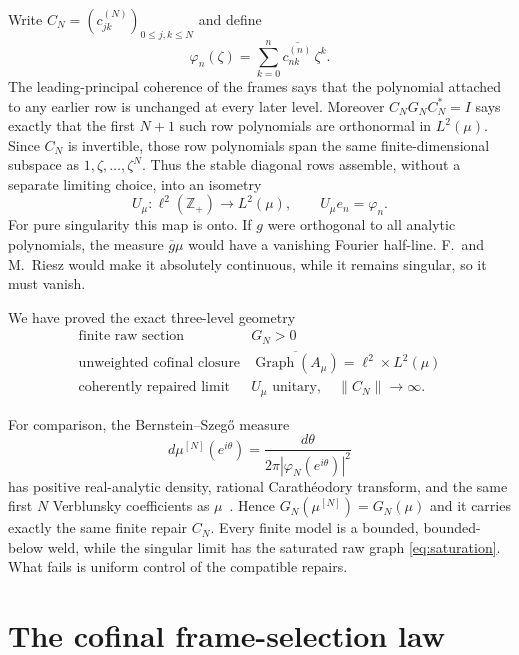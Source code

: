 \documentclass[11pt]{article}
\newcommand{\Graph}{\operatorname{Graph}}
\begin{document}
Write $C_N=(c^{(N)}_{jk})_{0\leq j,k\leq N}$ and define
\[
  \varphi_n(\zeta)=\sum_{k=0}^n\overline{c^{(n)}_{nk}}\,\zeta^k.
\]
The leading-principal coherence of the frames says that the polynomial attached to any earlier
row is unchanged at every later level.  Moreover $C_NG_NC_N^*=I$ says exactly that the first
$N+1$ such row polynomials are orthonormal in $L^2(\mu)$.  Since $C_N$ is invertible, those row
polynomials span the same finite-dimensional subspace as $1,\zeta,\ldots,\zeta^N$.  Thus the
stable diagonal rows assemble, without a separate limiting choice, into an isometry
\begin{equation}\label{eq:unitary-map}
  U_\mu:\ell^2(\mathbb Z_+)\longrightarrow L^2(\mu),
  \qquad U_\mu e_n=\varphi_n.
\end{equation}
For pure singularity this map is onto.  If $g$ were orthogonal to all analytic polynomials, the
measure $\overline g\mu$ would have a vanishing Fourier half-line.  F.~and M.~Riesz would make it
absolutely continuous, while it remains singular, so it must vanish.

We have proved the exact three-level geometry
\begin{equation}\label{eq:trichotomy}
\begin{array}{c|c}
\text{finite raw section}&G_N>0\\
\text{unweighted cofinal closure}&\overline{\Graph(A_\mu)}
  =\ell^2\times L^2(\mu)\\
\text{coherently repaired limit}&U_\mu\text{ unitary},\quad \|C_N\|\to\infty.
\end{array}
\end{equation}

For comparison, the Bernstein--Szeg\H{o} measure
\begin{equation}\label{eq:bs}
  d\mu^{[N]}(e^{i\theta})=
  \frac{d\theta}{2\pi|\varphi_N(e^{i\theta})|^2}
\end{equation}
has positive real-analytic density, rational Carath\'eodory transform, and the same first $N$
Verblunsky coefficients as $\mu$~\cite{Simon2005}.  Hence
$G_N(\mu^{[N]})=G_N(\mu)$ and it carries exactly the same finite repair $C_N$.
Every finite model is a bounded, bounded-below weld, while the singular limit has the saturated
raw graph \eqref{eq:saturation}.  What fails is uniform control of the compatible repairs.

\section{The cofinal frame-selection law}\label{sec:combined}
\end{document}
